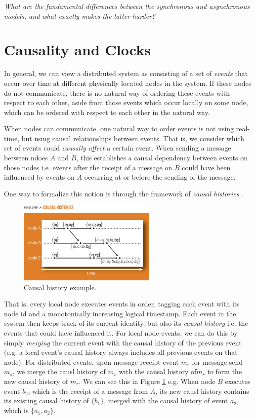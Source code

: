 \documentclass[10pt,a4paper]{article}
\begin{document}
\textit{What are the fundamental differences between the synchronous and asynchronous models, and what exactly makes the latter harder?}

\section{Causality and Clocks}

In general, we can view a distributed system as consisting of a set of \textit{events} that occur over time at different physically located nodes in the system. If these nodes do not communicate, there is no natural way of ordering these events with respect to each other, aside from those events which occur locally on some node, which can be ordered with respect to each other in the natural way.

When nodes can communicate, one natural way to order events is not using real-time, but using causal relationships between events. That is, we consider which set of events could \textit{causally affect} a certain event. When sending a message between ndoes $A$ and $B$, this establishes a causal dependency between events on those nodes i.e. events after the receipt of a message on $B$ could have been influenced by events on $A$ occurring at or before the sending of the message.

One way to formalize this notion is through the framework of \textit{causal histories} \cite{2016baqueroclocks}. 
\begin{figure}[h]
    \label{fig:baquero2}
    \centering
    \includegraphics[width=0.6\textwidth]{diagrams/baquero2.png}
    \caption{Causal history example.}
\end{figure}
That is, every local node executes events in order, tagging each event with its node id and a monotonically increasing logical timestamp. Each event in the system then keeps track of its current identity, but also its \textit{causal history} i.e. the events that could have influenced it. For local node events, we can do this by simply \textit{merging} the current event with the causal history of the previous event (e.g. a local event's causal history always includes all previous events on that node). For distributed events, upon message receipt event $m_r$ for message send $m_s$, we merge the causl history of $m_s$ with the causal history of$m_r$ to form the new causal history of $m_r$. We can see this in Figure \ref{fig:baquero2} e.g. When node $B$ executes event $b_2$, which is the receipt of a message from $A$, its new causl history contains its existing causal history of $\{b_1\}$, merged with the causal history of event $a_2$, which is $\{a_1, a_2\}$.
\end{document}
